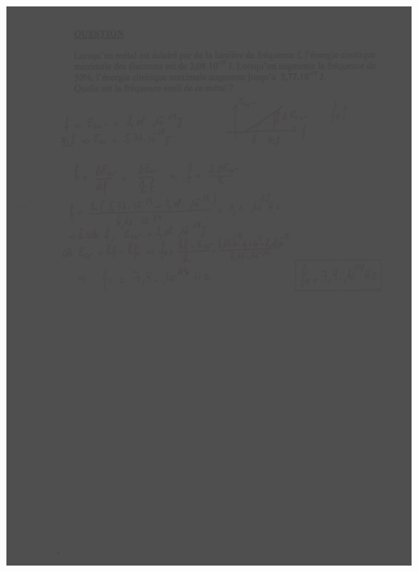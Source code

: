 {{{\includegraphics[width=17.498cm,height=24.13cm]{Pictures/10000001000002570000033B637F3053717E0CEA.png}

}}}

